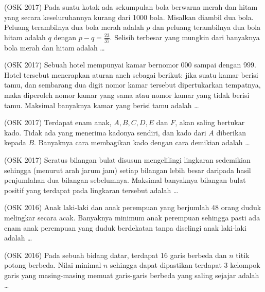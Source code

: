 \documentclass[12pt]{scrartcl}
\begin{document}
	\begin{soalbaru}
	(OSK 2017) Pada suatu kotak ada sekumpulan bola berwarna merah dan hitam yang secara keseluruhannya
kurang dari 1000 bola. Misalkan diambil dua bola. Peluang terambilnya dua bola merah adalah $p$
dan peluang terambilnya dua bola hitam adalah $q$ dengan $p-q =\frac{23}{37}$. Selisih terbesar yang mungkin dari banyaknya bola merah dan hitam adalah \dots
	\end{soalbaru}
	
	\begin{soalbaru}(OSK 2017)
	Sebuah hotel mempunyai kamar bernomor 000 sampai dengan 999. Hotel tersebut menerapkan
aturan aneh sebagai berikut: jika suatu kamar berisi tamu, dan sembarang dua digit nomor kamar
tersebut dipertukarkan tempatnya, maka diperoleh nomor kamar yang sama atau nomor kamar
yang tidak berisi tamu. Maksimal banyaknya kamar yang berisi tamu adalah \dots
	\end{soalbaru}
	
	\begin{soalbaru}
	(OSK 2017) Terdapat enam anak, $A, B, C, D, E$ dan $F$, akan saling bertukar kado. Tidak ada yang menerima
kadonya sendiri, dan kado dari $A$ diberikan kepada $B$. Banyaknya cara membagikan kado dengan
cara demikian adalah \dots
	\end{soalbaru}
	
	\begin{soalbaru}
	(OSK 2017) Seratus bilangan bulat disusun mengelilingi lingkaran sedemikian sehingga (menurut arah jarum
jam) setiap bilangan lebih besar daripada hasil penjumlahan dua bilangan sebelumnya. Maksimal
banyaknya bilangan bulat positif yang terdapat pada lingkaran tersebut adalah \dots
	\end{soalbaru}
	
	\begin{soalbaru}
	(OSK 2016)
	Anak laki-laki dan anak perempuan yang berjumlah 48 orang duduk melingkar secara acak.
Banyaknya minimum anak perempuan sehingga pasti ada enam anak perempuan yang duduk
berdekatan tanpa diselingi anak laki-laki adalah \dots
	\end{soalbaru}
	
	\begin{soalbaru}
	(OSK 2016) Pada sebuah bidang datar, terdapat 16 garis berbeda dan $n$ titik potong berbeda. Nilai
minimal $n$ sehingga dapat dipastikan terdapat 3 kelompok garis yang masing-masing memuat
garis-garis berbeda yang saling sejajar adalah \dots
	\end{soalbaru}
	
\end{document}
